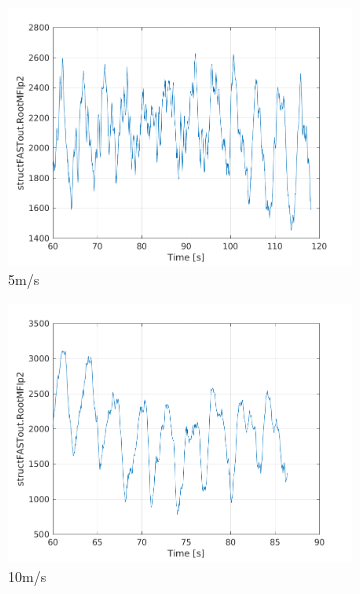 \documentclass[10pt]{article}
\begin{document}
\begin{figure}[H]
  \centering
\begin{subfigure}{0.40\textwidth}
  \includegraphics[width=1\linewidth]{../CIP_6/FAST/Plots_ws5/RootMFlp2.png}
  \caption{5m/s}
\end{subfigure}
\begin{subfigure}{0.40\textwidth}
  \includegraphics[width=1\linewidth]{../CIP_6/FAST/Plots_ws10/RootMFlp2.png}
  \caption{10m/s}
\end{subfigure}
\begin{subfigure}{0.40\textwidth}

\end{subfigure}
\end{figure}
\end{document}
